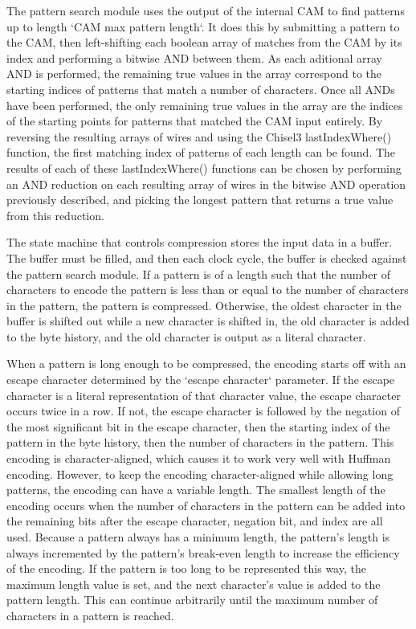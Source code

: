 \documentclass[doublespace,nopageskip]{VTthesis}
\begin{document}
The pattern search module uses the output of the internal CAM to find patterns up to length `CAM max pattern length`. It does this by submitting a pattern to the CAM, then left-shifting each boolean array of matches from the CAM by its index and performing a bitwise AND between them. As each aditional array AND is performed, the remaining true values in the array correspond to the starting indices of patterns that match a number of characters. Once all ANDs have been performed, the only remaining true values in the array are the indices of the starting points for patterns that matched the CAM input entirely. By reversing the resulting arrays of wires and using the Chisel3 lastIndexWhere() function, the first matching index of patterns of each length can be found. The results of each of these lastIndexWhere() functions can be chosen by performing an AND reduction on each resulting array of wires in the bitwise AND operation previously described, and picking the longest pattern that returns a true value from this reduction.

The state machine that controls compression stores the input data in a buffer. The buffer must be filled, and then each clock cycle, the buffer is checked against the pattern search module. If a pattern is of a length such that the number of characters to encode the pattern is less than or equal to the number of characters in the pattern, the pattern is compressed. Otherwise, the oldest character in the buffer is shifted out while a new character is shifted in, the old character is added to the byte history, and the old character is output as a literal character.

When a pattern is long enough to be compressed, the encoding starts off with an escape character determined by the `escape character` parameter. If the escape character is a literal representation of that character value, the escape character occurs twice in a row. If not, the escape character is followed by the negation of the most significant bit in the escape character, then the starting index of the pattern in the byte history, then the number of characters in the pattern. This encoding is character-aligned, which causes it to work very well with Huffman encoding. However, to keep the encoding character-aligned while allowing long patterns, the encoding can have a variable length. The smallest length of the encoding occurs when the number of characters in the pattern can be added into the remaining bits after the escape character, negation bit, and index are all used. Because a pattern always has a minimum length, the pattern's length is always incremented by the pattern's break-even length to increase the efficiency of the encoding. If the pattern is too long to be represented this way, the maximum length value is set, and the next character's value is added to the pattern length. This can continue arbitrarily until the maximum number of characters in a pattern is reached. 
\end{document}
